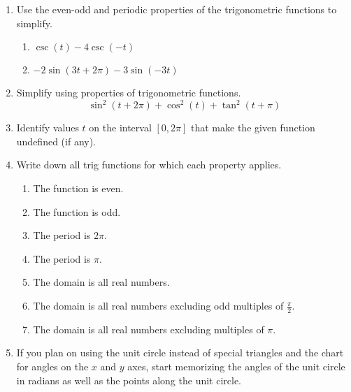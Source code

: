 \begin{enumerate}
\item Use the even-odd and periodic properties of the trigonometric functions to simplify.
\begin{enumerate}
\item $\csc(t)-4\csc(-t)$\vfill
\item $-2\sin(3t+2\pi)-3\sin(-3t)$\vfill
\end{enumerate}

\vfill


\item Simplify using properties of trigonometric functions. $$\sin^2(t+2\pi)+\cos^2(t)+\tan^2(t+\pi)$$
\vfill

\clearpage
\item Identify values $t$ on the interval $[0,2\pi]$ that make the given function undefined (if any).
\begin{enumerate}
\end{enumerate}

\item Write down all trig functions for which each property applies.
\begin{enumerate}
\item The function is even.\vfill
\item The function is odd.\vfill
\item The period is $2\pi$.\vfill
\item The period is $\pi$.\vfill
\item The domain is all real numbers.\vfill
\item The domain is all real numbers excluding odd multiples of $\frac{\pi}{2}$.\vfill
\item The domain is all real numbers excluding multiples of $\pi$.\vfill
\end{enumerate}
\clearpage

\item If you plan on using the unit circle instead of special triangles and the chart for angles on the $x$ and $y$ axes, start memorizing the angles of the unit circle in radians as well as the points along the unit circle.
\end{enumerate}

